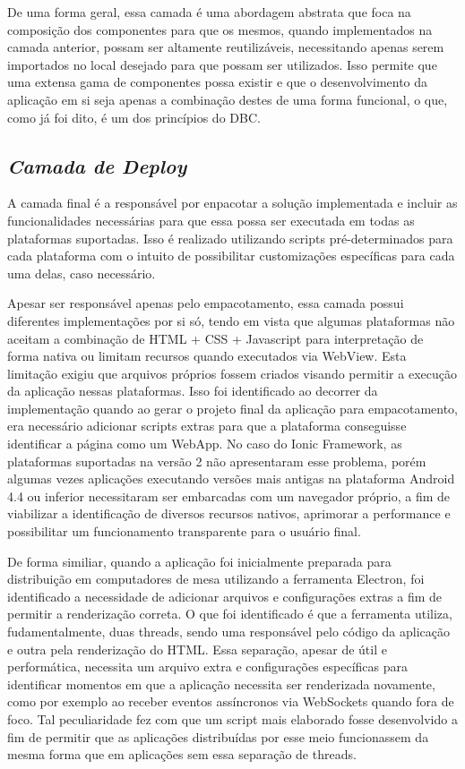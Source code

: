 De uma forma geral, essa camada é uma abordagem abstrata que foca na composição dos componentes para que os mesmos, quando implementados na camada anterior, possam ser altamente reutilizáveis, necessitando apenas serem importados no local desejado para que possam ser utilizados. Isso permite que uma extensa gama de componentes possa existir e que o desenvolvimento da aplicação em si seja apenas a combinação destes de uma forma funcional, o que, como já foi dito, é um dos princípios do DBC.

\subsection{{\it Camada de Deploy}}
A camada final é a responsável por enpacotar a solução implementada e incluir as funcionalidades necessárias para que essa possa ser executada em todas as plataformas suportadas. Isso é realizado utilizando scripts pré-determinados para cada plataforma com o intuito de possibilitar customizações específicas para cada uma delas, caso necessário. 

Apesar ser responsável apenas pelo empacotamento, essa camada possui diferentes implementações por si só, tendo em vista que algumas plataformas não aceitam a combinação de HTML + CSS + Javascript para interpretação de forma nativa ou limitam recursos quando executados via WebView. Esta limitação exigiu que arquivos próprios fossem criados visando permitir a execução da aplicação nessas plataformas. Isso foi identificado ao decorrer da implementação quando ao gerar o projeto final da aplicação para empacotamento, era necessário adicionar scripts extras para que a plataforma conseguisse identificar a página como um WebApp. No caso do Ionic Framework, as plataformas suportadas na versão 2 não apresentaram esse problema, porém algumas vezes aplicações executando versões mais antigas na plataforma Android 4.4 ou inferior necessitaram ser embarcadas com um navegador próprio, a fim de viabilizar a identificação de diversos recursos nativos, aprimorar a performance e possibilitar um funcionamento transparente para o usuário final.

De forma similiar, quando a aplicação foi inicialmente preparada para distribuição em computadores de mesa utilizando a ferramenta Electron, foi identificado a necessidade de adicionar arquivos e configurações extras a fim de permitir a renderização correta. O que foi identificado é que a ferramenta utiliza, fudamentalmente, duas threads, sendo uma responsável pelo código da aplicação e outra pela renderização do HTML. Essa separação, apesar de útil e performática, necessita um arquivo extra e configurações específicas para identificar momentos em que a aplicação necessita ser renderizada novamente, como por exemplo ao receber eventos assíncronos via WebSockets quando fora de foco. Tal peculiaridade fez com que um script mais elaborado fosse desenvolvido a fim de permitir que as aplicações distribuídas por esse meio funcionassem da mesma forma que em aplicações sem essa separação de threads.

